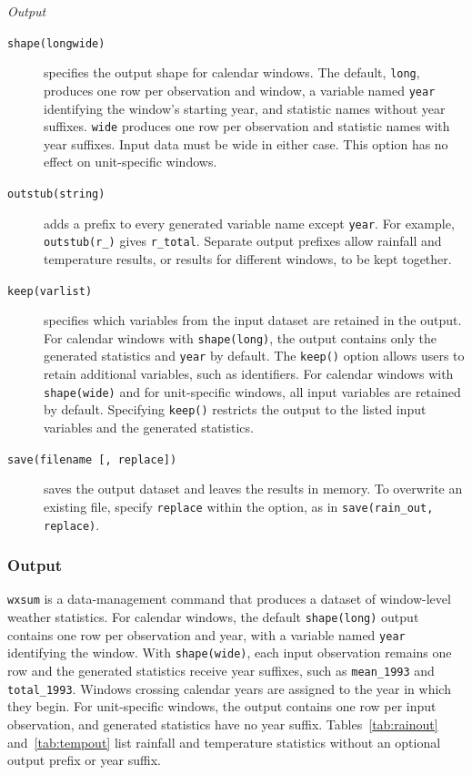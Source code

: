 \noindent\textit{Output}

\begin{description}
	\item[\texttt{shape(long\textbar wide)}] specifies the output shape for calendar windows. The default, \texttt{long}, produces one row per observation and window, a variable named \texttt{year} identifying the window's starting year, and statistic names without year suffixes. \texttt{wide} produces one row per observation and statistic names with year suffixes. Input data must be wide in either case. This option has no effect on unit-specific windows.
	\item[\texttt{outstub(string)}] adds a prefix to every generated variable name except \texttt{year}. For example, \texttt{outstub(r\_)} gives \texttt{r\_total}. Separate output prefixes allow rainfall and temperature results, or results for different windows, to be kept together.
    \item[\texttt{keep(varlist)}] specifies which variables from the input dataset are retained in the output. For calendar windows with \texttt{shape(long)}, the output contains only the generated statistics and \texttt{year} by default. The \texttt{keep()} option allows users to retain additional variables, such as identifiers. For calendar windows with \texttt{shape(wide)} and for unit-specific windows, all input variables are retained by default. Specifying \texttt{keep()} restricts the output to the listed input variables and the generated statistics.
	\item[\texttt{save(filename [, replace])}] saves the output dataset and leaves the results in memory. To overwrite an existing file, specify \texttt{replace} within the option, as in \texttt{save(rain\_out, replace)}.
\end{description}


\subsubsection{Output}

\texttt{wxsum} is a data-management command that produces a dataset of window-level weather statistics. For calendar windows, the default \texttt{shape(long)} output contains one row per observation and year, with a variable named \texttt{year} identifying the window. With \texttt{shape(wide)}, each input observation remains one row and the generated statistics receive year suffixes, such as \texttt{mean\_1993} and \texttt{total\_1993}. Windows crossing calendar years are assigned to the year in which they begin. For unit-specific windows, the output contains one row per input observation, and generated statistics have no year suffix. Tables~\ref{tab:rainout} and~\ref{tab:tempout} list rainfall and temperature statistics without an optional output prefix or year suffix.

